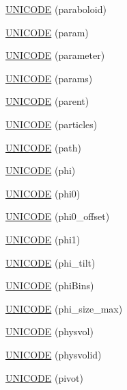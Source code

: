 \begin{DoxyCompactItemize}
\item 
\hyperlink{namespace_d_d4hep_1_1_x_m_l_adb51e1970de68435c3f5fbdeb4fe3085}{U\+N\+I\+C\+O\+DE} (paraboloid)
\item 
\hyperlink{namespace_d_d4hep_1_1_x_m_l_a9187d85c4a29b10e6850e1a5d656b188}{U\+N\+I\+C\+O\+DE} (param)
\item 
\hyperlink{namespace_d_d4hep_1_1_x_m_l_ad4f9a8705d58aa84ec0717cfd7561c5a}{U\+N\+I\+C\+O\+DE} (parameter)
\item 
\hyperlink{namespace_d_d4hep_1_1_x_m_l_a52e98f661a83987e20957764c15ac19b}{U\+N\+I\+C\+O\+DE} (params)
\item 
\hyperlink{namespace_d_d4hep_1_1_x_m_l_afe65bb95b8cfe84f23d42ff297a4d33f}{U\+N\+I\+C\+O\+DE} (parent)
\item 
\hyperlink{namespace_d_d4hep_1_1_x_m_l_a0ec0e2eb98dda2bec1b970f3e51c1bfd}{U\+N\+I\+C\+O\+DE} (particles)
\item 
\hyperlink{namespace_d_d4hep_1_1_x_m_l_a96980e420aa2607ee1714eb0358f0054}{U\+N\+I\+C\+O\+DE} (path)
\item 
\hyperlink{namespace_d_d4hep_1_1_x_m_l_a866db1958e001c63d3211b496605e212}{U\+N\+I\+C\+O\+DE} (phi)
\item 
\hyperlink{namespace_d_d4hep_1_1_x_m_l_a9551f886e9ee6a2333626ada3c047129}{U\+N\+I\+C\+O\+DE} (phi0)
\item 
\hyperlink{namespace_d_d4hep_1_1_x_m_l_a536a0baada377b69d18a17d281d38222}{U\+N\+I\+C\+O\+DE} (phi0\+\_\+offset)
\item 
\hyperlink{namespace_d_d4hep_1_1_x_m_l_afadb48f0b9a0a1314fd125736d04e77a}{U\+N\+I\+C\+O\+DE} (phi1)
\item 
\hyperlink{namespace_d_d4hep_1_1_x_m_l_ae0ac409da46cdab3d21dbab61c6ab2ba}{U\+N\+I\+C\+O\+DE} (phi\+\_\+tilt)
\item 
\hyperlink{namespace_d_d4hep_1_1_x_m_l_aeb36f68f2fb69e32f27bb50a76737817}{U\+N\+I\+C\+O\+DE} (phi\+Bins)
\item 
\hyperlink{namespace_d_d4hep_1_1_x_m_l_ac8edac64d777f435f802b6f1382b8113}{U\+N\+I\+C\+O\+DE} (phi\+\_\+size\+\_\+max)
\item 
\hyperlink{namespace_d_d4hep_1_1_x_m_l_abe5962ef731f90418ba65dc059a9954a}{U\+N\+I\+C\+O\+DE} (physvol)
\item 
\hyperlink{namespace_d_d4hep_1_1_x_m_l_ae013ea60a3fb4a7149b662fd09775cf8}{U\+N\+I\+C\+O\+DE} (physvolid)
\item 
\hyperlink{namespace_d_d4hep_1_1_x_m_l_af1be45c40a6ef0e5d1369bcd273c6524}{U\+N\+I\+C\+O\+DE} (pivot)
\item 

\end{DoxyCompactItemize}
